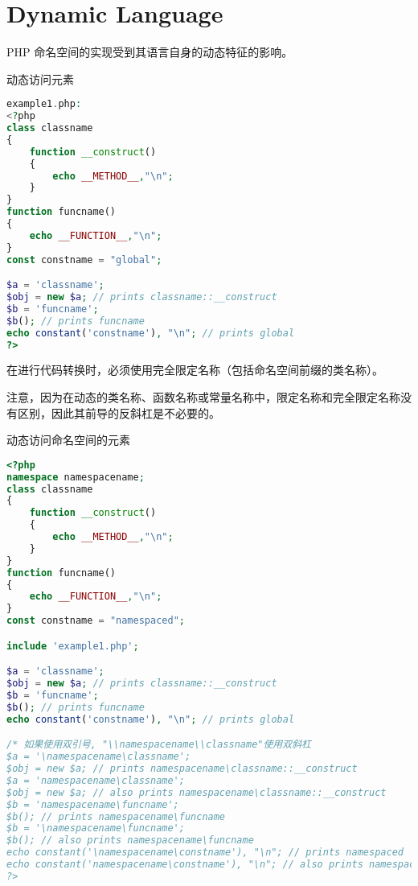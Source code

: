 \section{Dynamic Language}


PHP 命名空间的实现受到其语言自身的动态特征的影响。

\begin{example}
动态访问元素
\begin{lstlisting}[language=PHP]
example1.php:
<?php
class classname
{
    function __construct()
    {
        echo __METHOD__,"\n";
    }
}
function funcname()
{
    echo __FUNCTION__,"\n";
}
const constname = "global";

$a = 'classname';
$obj = new $a; // prints classname::__construct
$b = 'funcname';
$b(); // prints funcname
echo constant('constname'), "\n"; // prints global
?>
\end{lstlisting}
\end{example}

在进行代码转换时，必须使用完全限定名称（包括命名空间前缀的类名称）。

注意，因为在动态的类名称、函数名称或常量名称中，限定名称和完全限定名称没有区别，因此其前导的反斜杠是不必要的。







\begin{example}
动态访问命名空间的元素
\begin{lstlisting}[language=PHP]
<?php
namespace namespacename;
class classname
{
    function __construct()
    {
        echo __METHOD__,"\n";
    }
}
function funcname()
{
    echo __FUNCTION__,"\n";
}
const constname = "namespaced";

include 'example1.php';

$a = 'classname';
$obj = new $a; // prints classname::__construct
$b = 'funcname';
$b(); // prints funcname
echo constant('constname'), "\n"; // prints global

/* 如果使用双引号, "\\namespacename\\classname"使用双斜杠
$a = '\namespacename\classname';
$obj = new $a; // prints namespacename\classname::__construct
$a = 'namespacename\classname';
$obj = new $a; // also prints namespacename\classname::__construct
$b = 'namespacename\funcname';
$b(); // prints namespacename\funcname
$b = '\namespacename\funcname';
$b(); // also prints namespacename\funcname
echo constant('\namespacename\constname'), "\n"; // prints namespaced
echo constant('namespacename\constname'), "\n"; // also prints namespaced
?>
\end{lstlisting}
\end{example}

